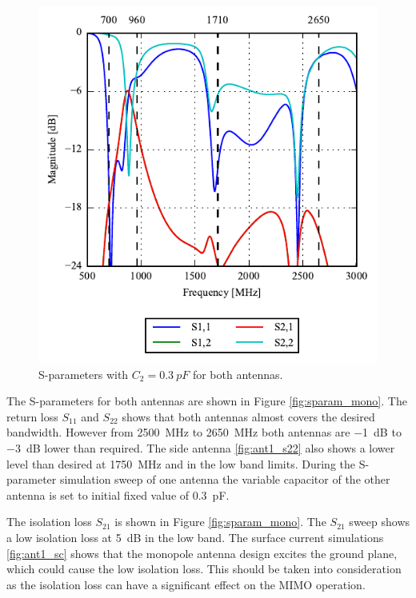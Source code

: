 \begin{figure}[htbp]
    \centering
    \includegraphics{img/tech_sol/monopole/ant1_sparam}
    \caption{S-parameters with $C_2=\SI{0.3}{pF}$ for both antennas.}
    \label{fig:ant1surfaces}
\end{figure}
The S-parameters for both antennas are shown in Figure \ref{fig:sparam_mono}. The return loss $S_{11}$ and $S_{22}$ shows that both antennas almost covers the desired bandwidth. However from \SI{2500}{MHz} to \SI{2650}{MHz} both antennas are \SI{-1}{dB} to \SI{-3}{dB} lower than required. The side antenna \ref{fig:ant1_s22} also shows a lower level than desired at \SI{1750}{MHz} and in the low band limits. During the S-parameter simulation sweep of one antenna the variable capacitor of the other antenna is set to initial fixed value of \SI{0.3}{pF}. 

The isolation loss $S_{21}$ is shown in Figure \ref{fig:sparam_mono}. The $S_{21}$ sweep shows a low isolation loss at \SI{5}{dB} in the low band. The surface current simulations \ref{fig:ant1_sc} shows that the monopole antenna design excites the ground plane, which could cause the low isolation loss. This should be taken into consideration as the isolation loss can have a significant effect on the MIMO operation.      

